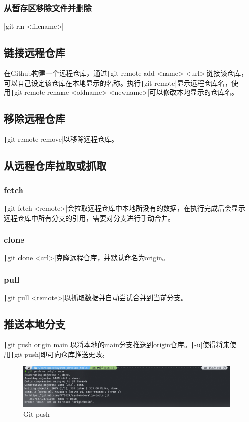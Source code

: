\documentclass[fontset=ubuntu]{ctexart}
\begin{document}
\subsubsection{从暂存区移除文件并删除}
|git rm <filename>|

\subsection{链接远程仓库}
在Github构建一个远程仓库，通过\texttt|git remote add <name> <url>|链接该仓库，可以自己设定该仓库在本地显示的名称。执行\texttt|git remote|显示远程仓库名，使用\texttt|git remote rename <oldname> <newname>|可以修改本地显示的仓库名。

\subsection{移除远程仓库}
\texttt|git remote remove|以移除远程仓库。

\subsection{从远程仓库拉取或抓取}
\subsubsection{fetch}
\texttt|git fetch <remote>|会拉取远程仓库中本地所没有的数据，在执行完成后会显示远程仓库中所有分支的引用，需要对分支进行手动合并。

\subsubsection{clone}
\texttt|git clone <url>|克隆远程仓库，并默认命名为origin。

\subsubsection{pull}
\texttt|git pull <remote>|以抓取数据并自动尝试合并到当前分支。

\subsection{推送本地分支}
\texttt|git push origin main|以将本地的main分支推送到origin仓库。\texttt|-u|使得将来使用\texttt|git push|即可向仓库推送更改。
\begin{figure}[htb]
    \centering
    \includegraphics[width=0.5\linewidth]{Git push.png}
    \caption{Git push}
    \label{fig:Git push}
\end{figure}
\end{document}
